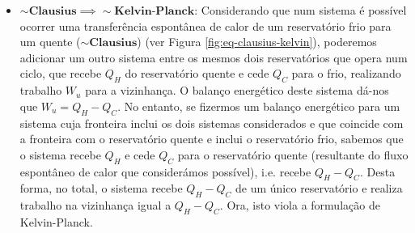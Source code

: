 \begin{itemize}
    \item $\sim \textbf{Clausius} \implies \sim \textbf{Kelvin-Planck}$: Considerando que num sistema é possível ocorrer uma transferência espontânea de calor de um reservatório frio para um quente ($\sim \textbf{Clausius}$) (ver Figura \ref{fig:eq-clausius-kelvin}), poderemos adicionar um outro sistema entre os mesmos dois reservatórios que opera num ciclo, que recebe $Q_H$ do reservatório quente e cede $Q_C$ para o frio, realizando trabalho $W_u$ para a vizinhança. O balanço energético deste sistema dá-nos que $W_u = Q_H - Q_C$. No entanto, se fizermos um balanço energético para um sistema cuja fronteira inclui os dois sistemas considerados e que coincide com a fronteira com o reservatório quente e inclui o reservatório frio, sabemos que o sistema recebe $Q_H$ e cede $Q_C$ para o reservatório quente (resultante do fluxo espontâneo de calor que considerámos possível), i.e. recebe $Q_H - Q_C$. Desta forma, no total, o sistema recebe $Q_H - Q_C$ de um único reservatório e realiza trabalho na vizinhança igual a $Q_H - Q_C$. Ora, isto viola a formulação de Kelvin-Planck. \\ 
    
    \begin{figure}[H]
        \centering
\end{figure}
\end{itemize}
